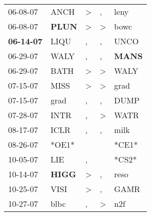 \begin{supertabular}{p{0.07\textwidth}p{0.06\textwidth}p{0.02\textwidth}p{0.02\textwidth}p{0.06\textwidth}}
          06-08-07\textsuperscript{} &           ANCH\textsuperscript{} &     \textgreater &                , &           leny\textsuperscript{} \\
          06-08-07\textsuperscript{} &  \textbf{PLUN\textsuperscript{}} &     \textgreater &     \textgreater &           bowc\textsuperscript{} \\
 \textbf{06-14-07\textsuperscript{}} &           LIQU\textsuperscript{} &                , &                , &           UNCO\textsuperscript{} \\
          06-29-07\textsuperscript{} &           WALY\textsuperscript{} &                , &                , &  \textbf{MANS\textsuperscript{}} \\
          06-29-07\textsuperscript{} &           BATH\textsuperscript{} &     \textgreater &     \textgreater &           WALY\textsuperscript{} \\
          07-15-07\textsuperscript{} &           MISS\textsuperscript{} &     \textgreater &     \textgreater &           grad\textsuperscript{} \\
          07-15-07\textsuperscript{} &           grad\textsuperscript{} &                , &                , &           DUMP\textsuperscript{} \\
          07-28-07\textsuperscript{} &           INTR\textsuperscript{} &                , &     \textgreater &           WATR\textsuperscript{} \\
          08-17-07\textsuperscript{} &           ICLR\textsuperscript{} &                , &                , &           milk\textsuperscript{} \\
          08-26-07\textsuperscript{} &                            *OE1* &                  &                  &                            *CE1* \\
          10-05-07\textsuperscript{} &            LIE\textsuperscript{} &                , &                  &                            *CS2* \\
          10-14-07\textsuperscript{} &  \textbf{HIGG\textsuperscript{}} &     \textgreater &                , &           reso\textsuperscript{} \\
          10-25-07\textsuperscript{} &           VISI\textsuperscript{} &     \textgreater &                , &           GAMR\textsuperscript{} \\
          10-27-07\textsuperscript{} &           blbc\textsuperscript{} &                , &     \textgreater &            n2f\textsuperscript{} \\

\end{supertabular}
